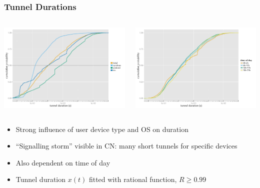 \documentclass{beamer}
\begin{document}
\begin{frame}
	\frametitle{Tunnel Durations}

	\begin{columns}[T]
			\includegraphics[width=\columnwidth]{../../chapters/041-mobilenetsmeasuring/images/R-tunnel-duration-operating-system.pdf}

			\includegraphics[width=\columnwidth]{../../chapters/041-mobilenetsmeasuring/images/R-duration-timeofday-ecdf.pdf}
	\end{columns}

	\begin{itemize}
		\item Strong influence of user device type and OS on duration
		\item ``Signalling storm'' visible in CN: many short tunnels for specific devices
		\item Also dependent on time of day
		\item Tunnel duration $x(t)$ fitted with rational function, $R \geq 0.99$
	\end{itemize}
\end{frame}
\end{document}

